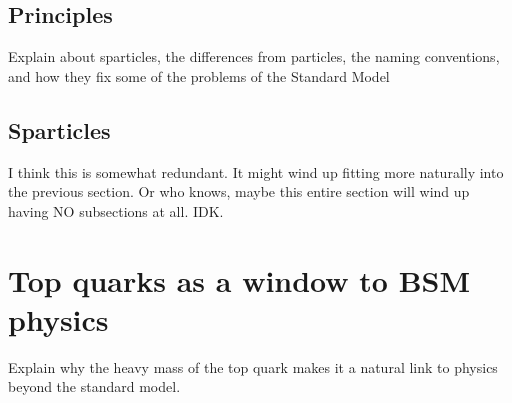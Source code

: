 \subsection{Principles}
\label{ssec:susyprinciples}

Explain about sparticles, the differences from particles,
the naming conventions, and how they fix some of the problems
of the Standard Model

\subsection{Sparticles}
\label{ssec:susysparticles}

I think this is somewhat redundant. It might wind up fitting more
naturally into the previous section. Or who knows, maybe this entire
section will wind up having NO subsections at all. IDK.

\section{Top quarks as a window to BSM physics}
\label{sec:topquarks}

Explain why the heavy mass of the top quark makes it a natural link
to physics beyond the standard model.
